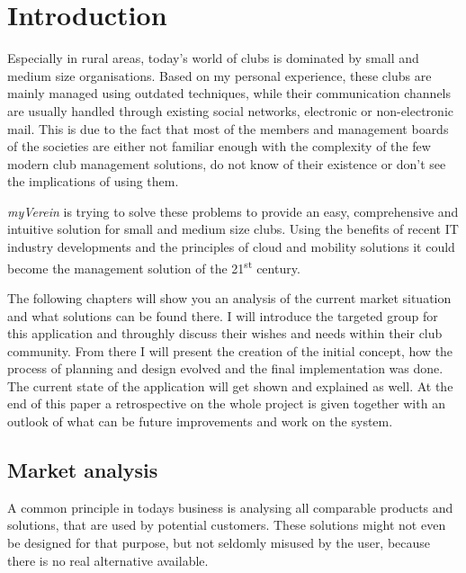 \pagestyle{fancy}
\lhead{}
\renewcommand{\headrulewidth}{0pt}
\setlength{\headheight}{14pt}

\chapter{Introduction}
\label{chapter:Intro}

Especially in rural areas, today's world of clubs is dominated by small and medium size organisations. Based on my personal experience, these clubs are mainly managed using outdated techniques, while their communication channels are usually handled through existing social networks, electronic or non-electronic mail. This is due to the fact that most of the members and management boards of the societies are either not familiar enough with the complexity of the few modern club management solutions, do not know of their existence or don't see the implications of using them.

\emph{myVerein} is trying to solve these problems to provide an easy, comprehensive and intuitive solution for small and medium size clubs. Using the benefits of recent IT industry developments and the principles of cloud and mobility solutions it could become the management solution of the 21\textsuperscript{st} century. 

The following chapters will show you an analysis of the current market situation and what solutions can be found there. I will introduce the targeted group for this application and throughly discuss their wishes and needs within their club community. From there I will present the creation of the initial concept, how the process of planning and design evolved and the final implementation was done. The current state of the application will get shown and explained as well. At the end of this paper a retrospective on the whole project is given together with an outlook of what can be future improvements and work on the system.

\section{Market analysis}
\label{sec:MarketAnalysis}

A common principle in todays business is analysing all comparable products and solutions, that are used by potential customers. These solutions might not even be designed for that purpose, but not seldomly misused by the user, because there is no real alternative available.

